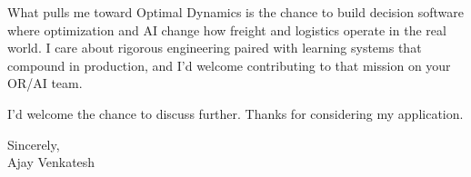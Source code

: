 \documentclass[letterpaper,11pt]{article}
\begin{document}
What pulls me toward Optimal Dynamics is the chance to build decision software where optimization and AI change how freight and logistics operate in the real world. I care about rigorous engineering paired with learning systems that compound in production, and I'd welcome contributing to that mission on your OR/AI team.

I'd welcome the chance to discuss further. Thanks for considering my application.

\vspace{12pt}
Sincerely, \\
Ajay Venkatesh
\end{document}

